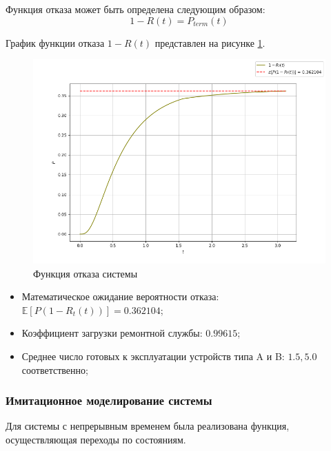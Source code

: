 Функция отказа может быть определена следующим образом:
$$1-R(t) = P_{term}(t)$$

График функции отказа $1-R(t)$ представлен на рисунке \ref{R_t}.
\begin{figure}[H]
\centerline{\includegraphics[width=\textwidth]{Images/R_t.png}}
\caption{Функция отказа системы}
\label{R_t}
\end{figure}

\begin{itemize}
    \item Математическое ожидание вероятности отказа:
$\mathbb{E}[P(1-R_t(t))]=0.362104 $;
\item Коэффициент загрузки ремонтной службы: $0.99615$;
\item Среднее число готовых к эксплуатации устройств типа  A и B: $1.5, 5.0$ соответственно;
\end{itemize}

\subsubsection{Имитационное моделирование системы}

Для системы с непрерывным временем была реализована функция, осуществляющая переходы по состояниям.

